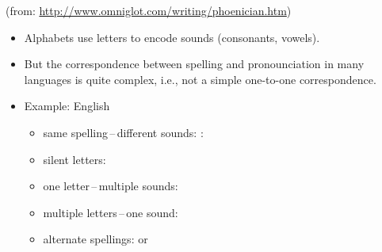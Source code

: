 \documentclass[a4paper,landscape,headrule,footrule,xetex]{foils}
\begin{document}
(from: \url{http://www.omniglot.com/writing/phoenician.htm})




\begin{itemize}
\item Alphabets use letters to encode sounds (consonants, vowels).
\item But the correspondence between spelling and pronounciation in many languages is quite complex, i.e., not a simple one-to-one correspondence.
\item Example: English
\begin{itemize}
\item same spelling\,–\,different sounds: : 
\item silent letters: 
\item one letter\,–\,multiple sounds: 
\item multiple letters\,–\,one sound: 
\item alternate spellings:  or 
\end{itemize}
\end{itemize}












\end{document}

